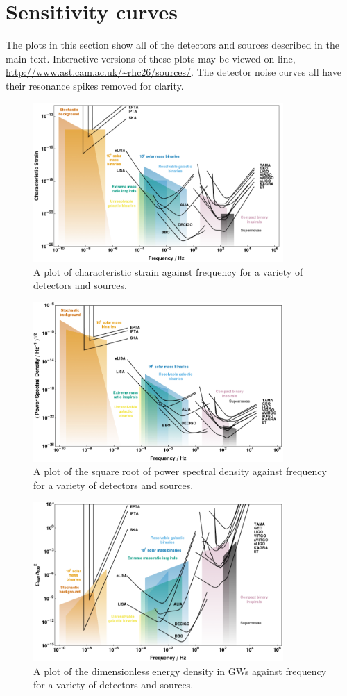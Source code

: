 \appendix
\section{Sensitivity curves}\label{app:a}
The plots in this section show all of the detectors and sources described in the main text. Interactive versions of these plots may be viewed on-line, \url{http://www.ast.cam.ac.uk/~rhc26/sources/}. The detector noise curves all have their resonance spikes removed for clarity. 
\begin{figure}
 \centering
 \includegraphics[trim=0cm 0cm 0cm 0cm, width=0.85\textwidth]{figure1.pdf}
 \caption{A plot of characteristic strain against frequency for a variety of detectors and sources.}
 \label{fig:hc}
\end{figure}
\begin{figure}
 \centering
 \includegraphics[trim=0cm 0cm 0cm 0cm, width=0.85\textwidth]{figure2.pdf}
 \caption{A plot of the square root of power spectral density against frequency for a variety of detectors and sources.}
 \label{fig:S}
\end{figure}
\begin{figure}
 \centering
 \includegraphics[trim=0cm 0cm 0cm 0cm, width=0.85\textwidth]{figure3.pdf}
 \caption{A plot of the dimensionless energy density in GWs against frequency for a variety of detectors and sources.}
 \label{fig:omega}
\end{figure}

